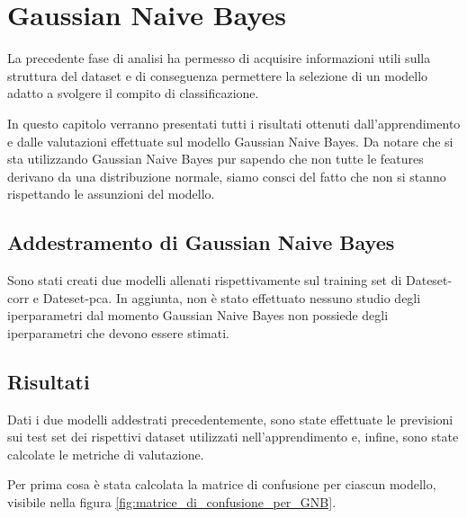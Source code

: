 \chapter{Gaussian Naive Bayes} \label{chp:bayes}
La precedente fase di analisi ha permesso di acquisire informazioni utili sulla
struttura del dataset e di conseguenza permettere la selezione di un modello
adatto a svolgere il compito di classificazione.

In questo capitolo verranno presentati tutti i risultati ottenuti dall'apprendimento
e dalle valutazioni effettuate sul modello Gaussian Naive Bayes. Da notare che 
si sta utilizzando Gaussian Naive Bayes pur sapendo che non tutte le features 
derivano da una distribuzione normale, siamo consci del fatto che non si stanno 
rispettando le assunzioni del modello.

\section{Addestramento di Gaussian Naive Bayes}
Sono stati creati due modelli allenati rispettivamente sul training set di Dateset-corr
e Dateset-pca. In aggiunta, non è stato effettuato nessuno studio degli iperparametri
dal momento Gaussian Naive Bayes non possiede degli iperparametri che devono essere
stimati.

\section{Risultati}

Dati i due modelli addestrati precedentemente, sono state effettuate le previsioni
sui test set dei rispettivi dataset utilizzati nell'apprendimento e, infine,
sono state calcolate le metriche di valutazione.

Per prima cosa è stata calcolata la matrice di confusione per ciascun modello,
visibile nella figura \ref{fig:matrice_di_confusione_per_GNB}.

